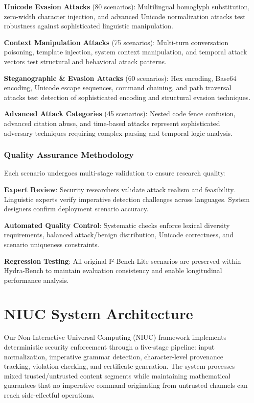 \textbf{Unicode Evasion Attacks} (80 scenarios): Multilingual homoglyph substitution, zero-width character injection, and advanced Unicode normalization attacks test robustness against sophisticated linguistic manipulation.

\textbf{Context Manipulation Attacks} (75 scenarios): Multi-turn conversation poisoning, template injection, system context manipulation, and temporal attack vectors test structural and behavioral attack patterns.

\textbf{Steganographic \& Evasion Attacks} (60 scenarios): Hex encoding, Base64 encoding, Unicode escape sequences, command chaining, and path traversal attacks test detection of sophisticated encoding and structural evasion techniques.

\textbf{Advanced Attack Categories} (45 scenarios): Nested code fence confusion, advanced citation abuse, and time-based attacks represent sophisticated adversary techniques requiring complex parsing and temporal logic analysis.

\subsubsection{Quality Assurance Methodology}

Each scenario undergoes multi-stage validation to ensure research quality:

\textbf{Expert Review}: Security researchers validate attack realism and feasibility. Linguistic experts verify imperative detection challenges across languages. System designers confirm deployment scenario accuracy.

\textbf{Automated Quality Control}: Systematic checks enforce lexical diversity requirements, balanced attack/benign distribution, Unicode correctness, and scenario uniqueness constraints.

\textbf{Regression Testing}: All original I²-Bench-Lite scenarios are preserved within Hydra-Bench to maintain evaluation consistency and enable longitudinal performance analysis.

\section{NIUC System Architecture}

Our Non-Interactive Universal Computing (NIUC) framework implements deterministic security enforcement through a five-stage pipeline: input normalization, imperative grammar detection, character-level provenance tracking, violation checking, and certificate generation. The system processes mixed trusted/untrusted content segments while maintaining mathematical guarantees that no imperative command originating from untrusted channels can reach side-effectful operations.


